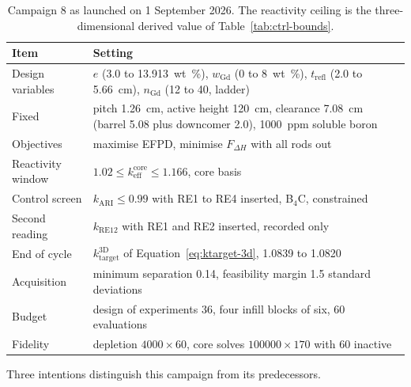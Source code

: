 \begin{table}[htbp]
  \centering
  \small
  \caption{Campaign 8 as launched on 1 September 2026. The reactivity
  ceiling is the three-dimensional derived value of
  Table~\ref{tab:ctrl-bounds}.}
  \label{tab:c8-spec}
  \begin{tabularx}{\textwidth}{@{}>{\raggedright\arraybackslash}p{4.2cm}>{\raggedright\arraybackslash}X@{}}
    \toprule
    Item & Setting \\
    \midrule
    Design variables & $e$ (3.0 to \SI{13.913}{wt\%}), $w_\mathrm{Gd}$ (0 to \SI{8}{wt\%}), $t_\mathrm{refl}$ (2.0 to \SI{5.66}{cm}), $n_\mathrm{Gd}$ (12 to 40, ladder) \\
    Fixed & pitch \SI{1.26}{cm}, active height \SI{120}{cm}, clearance \SI{7.08}{cm} (barrel \num{5.08} plus downcomer \num{2.0}), \SI{1000}{ppm} soluble boron \\
    Objectives & maximise EFPD, minimise $F_{\Delta H}$ with all rods out \\
    Reactivity window & $1.02 \le k_\mathrm{eff}^\mathrm{core} \le 1.166$, core basis \\
    Control screen & $k_\mathrm{ARI} \le 0.99$ with RE1 to RE4 inserted, B$_4$C, constrained \\
    Second reading & $k_\mathrm{RE12}$ with RE1 and RE2 inserted, recorded only \\
    End of cycle & $k_\mathrm{target}^\mathrm{3D}$ of Equation~\eqref{eq:ktarget-3d}, 1.0839 to 1.0820 \\
    Acquisition & minimum separation 0.14, feasibility margin 1.5 standard deviations \\
    Budget & design of experiments 36, four infill blocks of six, 60 evaluations \\
    Fidelity & depletion $4000\times60$, core solves $100000\times170$ with 60 inactive \\
    \bottomrule
  \end{tabularx}
\end{table}

Three intentions distinguish this campaign from its predecessors.

